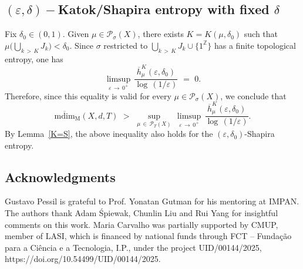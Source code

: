 \documentclass[11pt,a4paper,reqno]{amsart}
\theoremstyle{plain}
\theoremstyle{definition}
\newcommand{\field}[1]{\mathbb{#1}}
\newcommand{\ZZ}{\field{Z}}
\newcommand{\ep} {\varepsilon}
\newcommand{\si} {\sigma}       \newcommand{\Si}{\Sigma}
\newcommand{\cP}{{\mathcal P}}
\begin{document}

\subsection{$(\ep,\delta)-$Katok/Shapira entropy with fixed $\delta$}\label{constantdelta}

Fix $\delta_0\in (0,1)$. Given $\mu\in\cP_\si(X)$, there exists $K=K(\mu,\delta_0)$ such that $\mu\big( \bigcup_ {k\,>\,K} J_k\big) < \delta_0$. Since $\si$ restricted to $\bigcup_ {k\,>\,K} J_k\cup\{1^\ZZ\}$ has a finite topological entropy, one has
$$\limsup_{\ep\,\to\,0^+}\,  \frac{\overline{h}^K_{\mu}(\ep,\delta_0)}{\log\,(1/\ep)}\,\,=\,\,0.$$
Therefore, since this equality is valid for every $\mu\in\cP_\si(X)$, we conclude that 
$$\mathrm{\overline{mdim}_M}(X,d,T) \,\,> \,\, \sup_{\mu\,\in\,\cP_T(X)}\,\limsup_{\ep\,\to\,0^+}\, \frac{\overline{h}^K_{\mu}(\ep,\delta_0)}{\log\,(1/\ep)} .$$ By Lemma~\ref{K=S}, the above inequality also holds for the $(\ep,\delta_0)$-Shapira entropy.



\subsection*{Acknowledgments}
Gustavo Pessil is grateful to Prof. Yonatan Gutman for his mentoring at IMPAN. The authors thank Adam \'Spiewak, Chunlin Liu and Rui Yang for insightful comments on this work. Maria Carvalho was partially supported by CMUP, member of LASI, which is financed by national funds through FCT – Fundação para a Ciência e a Tecnologia, I.P., under the project UID/00144/2025, https://doi.org/10.54499/UID/00144/2025.
\end{document}

